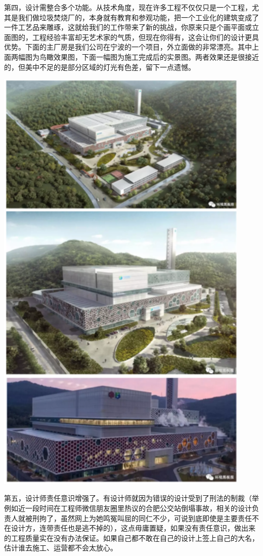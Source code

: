 \documentclass[]{book}
\begin{document}
第四，设计需整合多个功能。从技术角度，现在许多工程不仅仅只是一个工程，尤其是我们做垃圾焚烧厂的，本身就有教育和参观功能，把一个工业化的建筑变成了一件工艺品来雕琢，这就给我们的工作带来了新的挑战，你原来只是个画平面或立面图的，工程经验丰富却无艺术家的气质，但现在你得有，这会让你们的设计更具优势。下面的主厂房是我们公司在宁波的一个项目，外立面做的非常漂亮。其中上面两幅图为鸟瞰效果图，下面一幅图为施工完成后的实景图。两者效果还是很接近的，但美中不足的是部分区域的灯光有色差，留下一点遗憾。

\includegraphics[width=4.79in]{images/sisi5}

第五，设计师责任意识增强了。有设计师就因为错误的设计受到了刑法的制裁（举例如近一段时间在工程师微信朋友圈里热议的合肥公交站倒塌事故，相关的设计负责人就被刑拘了，虽然网上为她鸣冤叫屈的同仁不少，可说到底即使是主要责任不在设计方，连带责任也是逃不掉的），这点毋庸置疑，如果没有责任意识，做出来的工程质量实在没有办法保证。如果自己都不敢在自己的设计上签上自己的大名，估计谁去施工、运营都不会太放心。
\end{document}
